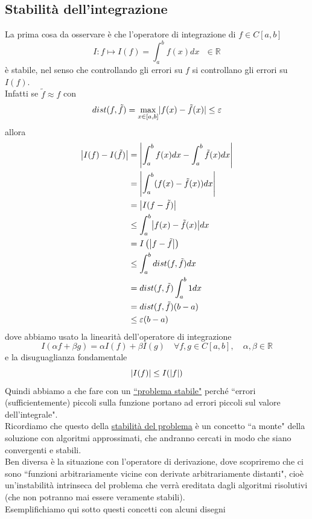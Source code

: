 \subsection{Stabilità dell'integrazione}
La prima cosa da osservare è che l'operatore di integrazione di $f\in C[a,b]$
\begin{equation*}
    I:f\longmapsto I(f)=\int_a^bf(x) dx\  \  \  \in\mathbb{R}
\end{equation*}
è stabile, nel senso che controllando gli errori su $f$ si controllano gli errori su $I(f)$.\\ Infatti se $\tilde{f}\approx f$ con 
\begin{equation*}
dist(f,\tilde{f})= \max_{x\in[a,b]}\abs{f(x)-\tilde{f}(x)}\leq\varepsilon
\end{equation*}
allora
\begin{equation*}
\begin{split}
        \abs*{I(f)-I(\tilde{f})} & = \abs*{\int_a^b f(x)dx-\int_a^b \tilde{f}(x)dx} \\
        & = \abs*{\int_a^b(f(x)-\tilde{f}(x))dx} \\
        & = \abs*{I(f-\tilde{f})} \\
        & \leq \int_a^b \abs*{f(x)-\tilde{f}(x)}dx \\
        & = I\left(\abs*{f-\tilde{f}}\right) \\
        & \leq \int_a^b dist(f,\tilde{f})dx \\
        & = dist(f, \tilde{f})\int_a^b 1 dx \\
        & = dist(f, \tilde{f})(b-a)\\
        & \leq\varepsilon(b-a)
\end{split}
\end{equation*}
dove abbiamo usato la linearità dell'operatore di integrazione
\begin{equation*}
        I(\alpha f+\beta g)=\alpha I(f)+\beta I(g)\quad \forall f,g\in C[a,b],\quad \alpha,\beta\in\mathbb{R}
\end{equation*}
e la disuguaglianza fondamentale
\begin{equation*}
    \abs*{I(f)} \leq I(\abs*{f})
\end{equation*}
Quindi abbiamo a che fare con un \uline{``problema stabile"} perché ``errori (sufficientemente) piccoli sulla funzione portano ad errori piccoli sul valore dell'integrale".\\
Ricordiamo che questo della \uline{stabilità del problema} è un concetto ``a monte" della soluzione con algoritmi approssimati, che andranno cercati in modo che siano convergenti e stabili. \\Ben diversa è la situazione con l'operatore di derivazione, dove scopriremo che ci sono ``funzioni arbitrariamente vicine con derivate arbitrariamente distanti", cioè un'instabilità intrinseca del problema che verrà ereditata dagli algoritmi risolutivi (che non potranno mai essere veramente stabili).\\ Esemplifichiamo  qui sotto questi concetti con alcuni disegni 

